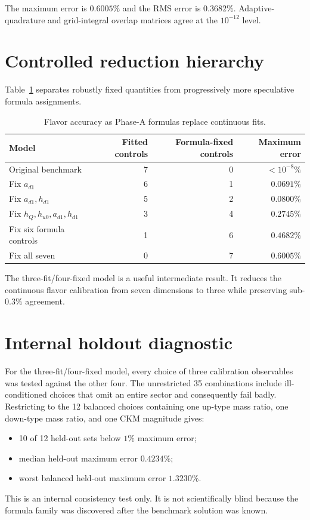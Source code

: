 \documentclass[11pt]{article}
\begin{document}
The maximum error is $0.6005\%$ and the RMS error is $0.3682\%$.  Adaptive-quadrature and grid-integral overlap matrices agree at the $10^{-12}$ level.

\section{Controlled reduction hierarchy}
Table~\ref{tab:models} separates robustly fixed quantities from progressively more speculative formula assignments.

\begin{table}[h]
\centering
\caption{Flavor accuracy as Phase-A formulas replace continuous fits.}
\label{tab:models}
\begin{tabular}{lrrr}
\toprule
Model & Fitted controls & Formula-fixed controls & Maximum error\\
\midrule
Original benchmark & 7 & 0 & $<10^{-8}\%$\\
Fix $a_{d1}$ & 6 & 1 & $0.0691\%$\\
Fix $a_{d1},h_{d1}$ & 5 & 2 & $0.0800\%$\\
Fix $h_Q,h_{u0},a_{d1},h_{d1}$ & 3 & 4 & $0.2745\%$\\
Fix six formula controls & 1 & 6 & $0.4682\%$\\
Fix all seven & 0 & 7 & $0.6005\%$\\
\bottomrule
\end{tabular}
\end{table}

The three-fit/four-fixed model is a useful intermediate result.  It reduces the continuous flavor calibration from seven dimensions to three while preserving sub-$0.3\%$ agreement.

\section{Internal holdout diagnostic}
For the three-fit/four-fixed model, every choice of three calibration observables was tested against the other four.  The unrestricted 35 combinations include ill-conditioned choices that omit an entire sector and consequently fail badly.  Restricting to the 12 balanced choices containing one up-type mass ratio, one down-type mass ratio, and one CKM magnitude gives:
\begin{itemize}
\item 10 of 12 held-out sets below $1\%$ maximum error;
\item median held-out maximum error $0.4234\%$;
\item worst balanced held-out maximum error $1.3230\%$.
\end{itemize}
This is an internal consistency test only.  It is not scientifically blind because the formula family was discovered after the benchmark solution was known.
\end{document}
